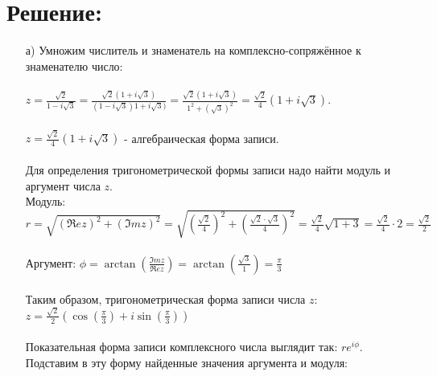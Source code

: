\documentclass[12pt, a4paper]{article}
\begin{document}
    \section*{Решение:}
    \begin{enumerate}
        \item [а)] 
        Умножим числитель и знаменатель на комплексно-сопряжённое 
        к знаменателю число:\\\\
        \begin{math}
            z = \frac{\sqrt{2}}{1 - i\sqrt{3}} =
             \frac{\sqrt{2}(1 + i\sqrt{3})}{(1 - i\sqrt{3})1 + i\sqrt{3})} =
             \frac{\sqrt{2}(1 + i\sqrt{3})}{1^2 + (\sqrt{3})^2} =
             \frac{\sqrt{2}}{4}(1 + i\sqrt{3}).
        \end{math}
        \\\\
        \begin{math}
            z = \frac{\sqrt{2}}{4}(1 + i\sqrt{3})
        \end{math}
        - алгебраическая форма записи.\\\\
        Для определения тригонометрической формы записи 
        надо найти модуль и аргумент числа $z$.\\
        Модуль:
        \begin{math}
            r = \sqrt{(\Re ez)^2 + (\Im mz)^2} = 
            \sqrt{(\frac{\sqrt{2}}{4})^2 + (\frac{\sqrt{2}\cdot\sqrt{3}}{4})^2} = 
            \frac{\sqrt{2}}{4}\sqrt{1 + 3} = 
            \frac{\sqrt{2}}{4}\cdot 2 =
            \frac{\sqrt{2}}{2}
        \end{math}
        \\\\
        Аргумент:
        \begin{math}
            \phi = \arctan(\frac{\Im mz}{\Re ez}) = 
            \arctan(\frac{\sqrt{3}}{1}) = 
            \frac{\pi}{3}
        \end{math}
        \\\\
        Таким образом, тригонометрическая форма записи числа $z$:\\
        $z = \frac{\sqrt{2}}{2}(\cos(\frac{\pi}{3}) + i\sin(\frac{\pi}{3}))$
        \\\\
        Показательная форма записи комплексного числа выглядит так: 
        $re^{i\phi}$.  Подставим в эту форму найденные значения аргумента и модуля:

\end{enumerate}
\end{document}
